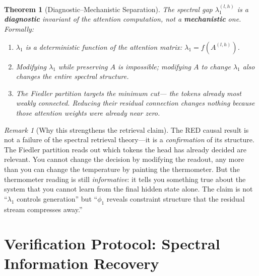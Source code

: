 \documentclass[11pt]{article}
\newtheorem{theorem}[definition]{Theorem}
\theoremstyle{remark}
\newtheorem{remark}[definition]{Remark}
\begin{document}
\begin{theorem}[Diagnostic--Mechanistic Separation]
\label{thm:separation}
The spectral gap $\lambda_1^{(l,h)}$ is a \textbf{diagnostic} 
invariant of the attention computation, not a 
\textbf{mechanistic} one. Formally:
\begin{enumerate}[nosep,label=(\roman*)]
  \item $\lambda_1$ is a deterministic function of the 
    attention matrix: $\lambda_1 = f(A^{(l,h)})$.
  \item Modifying $\lambda_1$ while preserving $A$ is 
    impossible; modifying $A$ to change $\lambda_1$ 
    also changes the entire spectral structure.
  \item The Fiedler partition targets the \emph{minimum cut}---
    the tokens already most weakly connected. Reducing their 
    residual connection changes nothing because those 
    attention weights were already near zero.
\end{enumerate}
\end{theorem}

\begin{remark}[Why this strengthens the retrieval claim]
\label{rem:strengthens}
The RED causal result is not a failure of the spectral 
retrieval theory---it is a \emph{confirmation} of its 
structure. The Fiedler partition reads out which tokens 
the head has already decided are relevant. You cannot 
change the decision by modifying the readout, any more 
than you can change the temperature by painting the 
thermometer. But the thermometer reading is still 
\emph{informative}: it tells you something true about 
the system that you cannot learn from the final hidden 
state alone. The claim is not ``$\lambda_1$ controls 
generation'' but ``$\phi_1$ reveals constraint structure 
that the residual stream compresses away.''
\end{remark}


\section{Verification Protocol: Spectral Information Recovery}
\label{sec:protocol}
\end{document}
